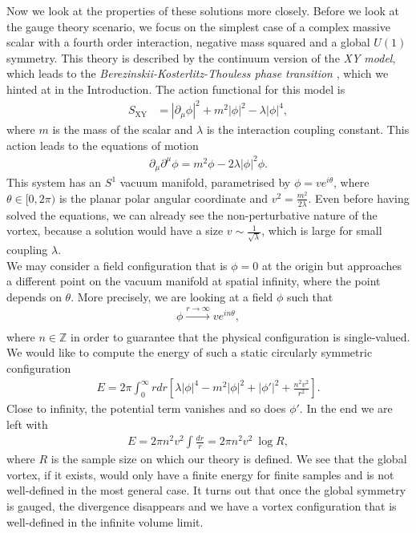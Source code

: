         Now we look at the properties of these solutions more closely. Before we look at the gauge theory scenario, we focus on the simplest case of a complex massive scalar with a fourth order interaction, negative mass squared and a global $U(1)$ symmetry. This theory is described by the continuum version of the \textit{XY model}, which leads to the \textit{Berezinskii-Kosterlitz-Thouless phase transition} \cite{Kosterlitz_1973, Berezinsky:1970fr, Berezinsky:1972rfj}, which we hinted at in the Introduction. The action functional for this model is
        \begin{align}
            S_{\text{XY}} &=  \left|\partial_{\mu} \phi \right|^2 + m^2 | \phi |^2 - \lambda |\phi|^4,
        \end{align}
where $m$ is the mass of the scalar and $\lambda$ is the interaction coupling constant.  This action leads to the equations of motion
    \begin{align}
        \partial_{\mu} \partial^{\mu} \phi = m^2 \phi - 2\lambda |\phi|^2 \phi.
    \end{align}
    This system has an $S^1$ vacuum manifold, parametrised by $\phi = v e^{i \theta}$, where $\theta \in [0,2\pi)$ is the planar polar angular coordinate and $v^2 = \frac{m^2}{2 \lambda}$. Even before having solved the equations, we can already see the non-perturbative nature of the vortex, because a solution would have a size $v\sim \frac{1}{\sqrt{\lambda}}$, which is large for small coupling $\lambda$.\\
    \indent We may consider a field configuration that is $\phi=0$ at the origin but approaches a different point on the vacuum manifold at spatial infinity, where the point depends on $\theta$. More precisely, we are looking at a field $\phi$ such that
    \begin{align}
        \phi \xrightarrow[]{r\rightarrow \infty} v e^{i n\theta},
    \end{align}
    where $n \in \mathbb{Z}$ in order to guarantee that the physical configuration is single-valued.
    We would like to compute the energy of such a static circularly symmetric configuration
    \begin{align}
        E= 2 \pi \int_0^{\infty} r dr \left[\lambda |\phi|^4 - m^2 |\phi|^2 + |\phi'|^2 + \frac{n^2 v^2}{r^2} \right].
    \end{align}
    Close to infinity, the potential term vanishes and so does $\phi'$. In the end we are left with
    \begin{align}
        E = 2\pi n^2 v^2 \int \frac{dr}{r} =  2\pi n^2 v^2  \ \log R,
    \end{align}
    where $R$ is the sample size on which our theory is defined. We see that the global vortex, if it exists, would only have a finite energy for finite samples and is not well-defined in the most general case. It turns out that once the global symmetry is gauged, the divergence disappears and we have a vortex configuration that is well-defined in the infinite volume limit.
